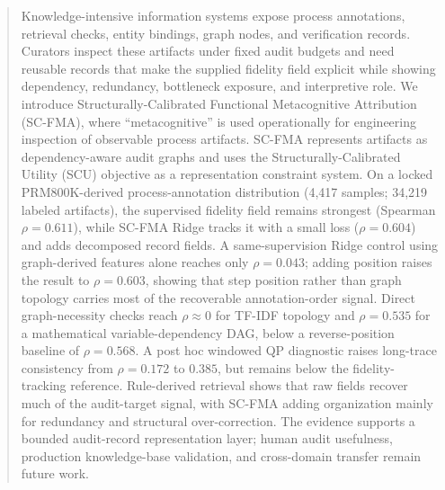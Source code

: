 \begin{abstract}
Knowledge-intensive information systems expose process annotations, retrieval checks, entity bindings, graph nodes, and verification records. Curators inspect these artifacts under fixed audit budgets and need reusable records that make the supplied fidelity field explicit while showing dependency, redundancy, bottleneck exposure, and interpretive role. We introduce Structurally-Calibrated Functional Metacognitive Attribution (SC-FMA), where ``metacognitive'' is used operationally for engineering inspection of observable process artifacts. SC-FMA represents artifacts as dependency-aware audit graphs and uses the Structurally-Calibrated Utility (SCU) objective as a representation constraint system. On a locked PRM800K-derived process-annotation distribution (4,417 samples; 34,219 labeled artifacts), the supervised \wstruct{} fidelity field remains strongest (Spearman $\rho=0.611$), while SC-FMA Ridge tracks it with a small loss ($\rho=0.604$) and adds decomposed record fields. A same-supervision Ridge control using graph-derived features alone reaches only $\rho=0.043$; adding position raises the result to $\rho=0.603$, showing that step position rather than graph topology carries most of the recoverable annotation-order signal. Direct graph-necessity checks reach $\rho\approx0$ for TF-IDF topology and $\rho=0.535$ for a mathematical variable-dependency DAG, below a reverse-position baseline of $\rho=0.568$. A post hoc windowed QP diagnostic raises long-trace consistency from $\rho=0.172$ to $0.385$, but remains below the fidelity-tracking reference. Rule-derived retrieval shows that raw fields recover much of the audit-target signal, with SC-FMA adding organization mainly for redundancy and structural over-correction. The evidence supports a bounded audit-record representation layer; human audit usefulness, production knowledge-base validation, and cross-domain transfer remain future work.
\end{abstract}
